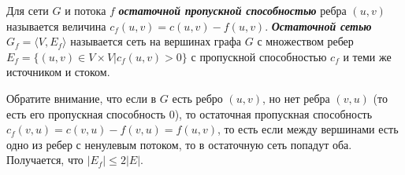 \begin{definition}
	Для сети $G$ и потока $f$ {\bf\it остаточной пропускной способностью} ребра $(u,v)$ называется величина $c_f(u,v)=c(u,v)-f(u,v)$. {\bf\it Остаточной сетью} $G_f=\langle V,E_f\rangle$ называется сеть на вершинах графа $G$ с множеством ребер $E_f=\{(u,v)\in V\times V|c_f(u,v)>0\}$ с пропускной способностью $c_f$ и теми же источником и стоком.
\end{definition}

Обратите внимание, что если в $G$ есть ребро $(u,v)$, но нет ребра $(v,u)$ (то есть его пропускная способность 0), то остаточная пропускная способность $c_f(v,u)=c(v,u)-f(v,u)=f(u,v)$, то есть если между вершинами есть одно из ребер с ненулевым потоком, то в остаточную сеть попадут оба.
Получается, что $|E_f|\le 2|E|$\label{someshit6}.

